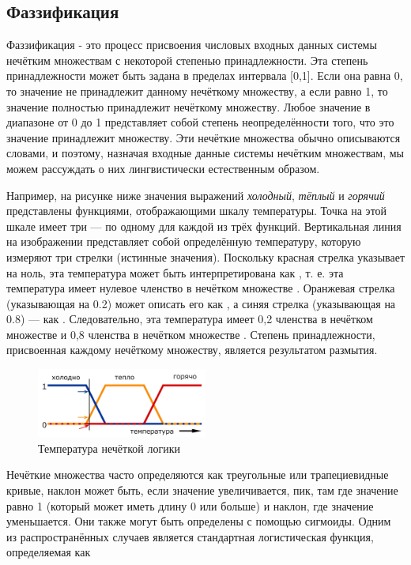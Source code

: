 \documentclass[a4paper,12pt]{report}
\begin{document}
\subsection{Фаззификация}
Фаззификация - это процесс присвоения числовых входных данных системы нечётким множествам с некоторой степенью принадлежности. Эта степень принадлежности может быть задана в пределах интервала [0,1]. Если она равна 0, то значение не принадлежит данному нечёткому множеству, а если равно 1, то значение полностью принадлежит нечёткому множеству. Любое значение в диапазоне от 0 до 1 представляет собой степень неопределённости того, что это значение принадлежит множеству. Эти нечёткие множества обычно описываются словами, и поэтому, назначая входные данные системы нечётким множествам, мы можем рассуждать о них лингвистически естественным образом.

Например, на рисунке ниже значения выражений \textit{холодный}, \textit{тёплый} и \textit{горячий} представлены функциями, отображающими шкалу температуры. Точка на этой шкале имеет три  --- по одному для каждой из трёх функций. Вертикальная линия на изображении представляет собой определённую температуру, которую измеряют три стрелки (истинные значения). Поскольку красная стрелка указывает на ноль, эта температура может быть интерпретирована как , т. е. эта температура имеет нулевое членство в нечётком множестве . Оранжевая стрелка (указывающая на 0.2) может описать его как , а синяя стрелка (указывающая на 0.8) --- как . Следовательно, эта температура имеет 0,2 членства в нечётком множестве  и 0,8 членства в нечётком множестве . Степень принадлежности, присвоенная каждому нечёткому множеству, является результатом размытия.

\begin{figure}[H]
	\centering
	\includegraphics[width=0.5\textwidth,keepaspectratio]{images/temp_example.jpg}
	\caption{Температура нечёткой логики}
\end{figure}

Нечёткие множества часто определяются как треугольные или трапециевидные кривые, наклон может быть, если значение увеличивается, пик, там где значение равно 1 (который может иметь длину 0 или больше) и наклон, где значение уменьшается. Они также могут быть определены с помощью сигмоиды. Одним из распространённых случаев является стандартная логистическая функция, определяемая как
\end{document}
